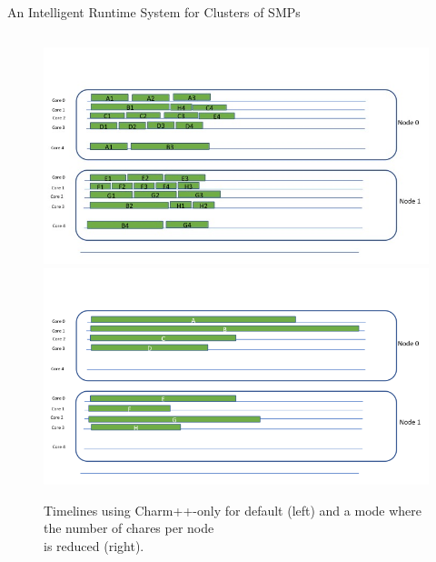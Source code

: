 \begin{frame}{An Intelligent Runtime System for Clusters of SMPs}{}
\begin{columns}
\begin{column}{0.5\columnwidth}
  \begin{figure}[ht!]
    \begin{center}
      \includegraphics[width=0.75\columnwidth]{./images/CharmLdbWithLoop-manyChares}\\
      \includegraphics[width=0.75\columnwidth]{./images/CharmLdbWithLoop-fewChares}
      \label{fig:charmcklooptimeline}
    \end{center}
    \caption{\label{fig:charmcklooptimeline}\small Timelines using Charm++-only for default (left) and a mode where the number of chares per node\\ is reduced (right). }
  \end{figure}
\end{column}
\end{columns}
\end{frame}

